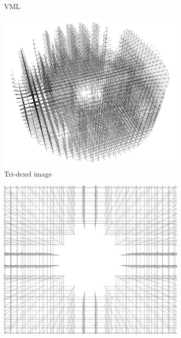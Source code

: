 \begin{figure}
\begin{subfigure}[t]{0.3\textwidth}
		\caption{VML}
		\label{fig:cylinder_head_classified}
	\end{subfigure}
	\begin{subfigure}[t]{0.3\textwidth}
		\centering
		\includegraphics[width=\textwidth]{images/cylinder_head_dexel_image}
		\caption{Tri-dexel image}
		\label{fig:cylinder_head_dexel_image}
	\end{subfigure}
	\begin{subfigure}[t]{0.3\textwidth}
		\centering
		\includegraphics[width=\textwidth]{images/cylinder_head_dexel_image_center}

\end{subfigure}
\end{figure}
